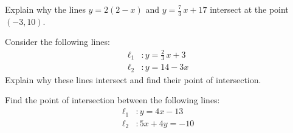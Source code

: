 \documentclass[11pt,letterpaper]{article}
\begin{document}

 Explain why the lines $y= 2(2 - x)$ and $y= \frac{7}{3}\,x + 17$ intersect at the point $(-3, 10)$. 



\newpage



 Consider the following lines:
	\[
	\begin{aligned}
	\ell_1&: y= \frac{2}{3}\,x + 3 \\[0.3cm]
	\ell_2&: y= 14 - 3x
	\end{aligned}
	\]
Explain why these lines intersect and find their point of intersection. 



\newpage



 Find the point of intersection between the following lines: 
	\[
	\begin{aligned}
	\ell_1&: y= 4x - 13 \\[0.3cm]
	\ell_2&: 5x + 4y= -10 
	\end{aligned}
	\]
\end{document}
